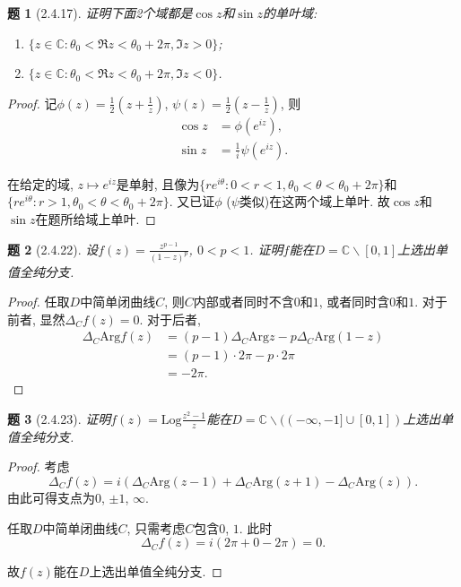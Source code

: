 \documentclass{article}[a4paper, 12pt]
\newtheorem{problem}{题}
\begin{document}
\begin{problem}[2.4.17]
  证明下面2个域都是\(\cos z\)和\(\sin z\)的单叶域:
  \begin{enumerate}
    \item \(\{z\in\mathbb C:\theta_0<\Re z<\theta_0+2\pi, \Im z>0\}\);
    \item \(\{z\in\mathbb C:\theta_0<\Re z<\theta_0+2\pi, \Im z<0\}\).
  \end{enumerate}
\end{problem}

\begin{proof}
  记\(\phi(z)=\frac12(z+\frac1z)\), \(\psi(z)=\frac12(z-\frac1z)\), 则\begin{align*}
    \cos z&=\phi(e^{iz}),\\
    \sin z&=\frac1i\psi(e^{iz}).
  \end{align*}

  在给定的域, \(z\mapsto e^{iz}\)是单射, 且像为\(\{re^{i\theta}:0<r<1,\theta_0<\theta<\theta_0+2\pi\}\)和\(\{re^{i\theta}:r>1,\theta_0<\theta<\theta_0+2\pi\}\). 又已证\(\phi\) (\(\psi\)类似)在这两个域上单叶. 故\(\cos z\)和\(\sin z\)在题所给域上单叶.
\end{proof}

\begin{problem}[2.4.22]
  设\(f(z)=\frac{z^{p-1}}{(1-z)^p}\), \(0<p<1\). 证明\(f\)能在\(D=\mathbb{C}\backslash[0,1]\)上选出单值全纯分支.
\end{problem}

\begin{proof}
  任取\(D\)中简单闭曲线\(C\), 则\(C\)内部或者同时不含\(0\)和\(1\), 或者同时含\(0\)和\(1\). 对于前者, 显然\(\Delta_C f(z)=0\). 对于后者, \begin{align*}
    \Delta_C \mathrm{Arg}f(z)
    &=(p-1)\Delta_C\mathrm{Arg}z-p\Delta_C\mathrm{Arg}(1-z)\\
    &=(p-1)\cdot2\pi-p\cdot2\pi\\
    &=-2\pi.
  \end{align*}
\end{proof}

\begin{problem}[2.4.23]
  证明\(f(z)=\mathrm{Log}\frac{z^2-1}{z}\)能在\(D=\mathbb{C}\backslash((-\infty,-1]\cup[0,1])\)上选出单值全纯分支.
\end{problem}

\begin{proof}
  考虑\[\Delta_C f(z)=i\left(\Delta_C\mathrm{Arg}(z-1)+\Delta_C\mathrm{Arg}(z+1)-\Delta_C\mathrm{Arg}(z)\right).\]
  由此可得支点为\(0\), \(\pm 1\), \(\infty\).

  任取\(D\)中简单闭曲线\(C\), 只需考虑\(C\)包含\(0\), \(1\). 此时
  \[\Delta_C f(z)=i(2\pi+0-2\pi)=0.\]

  故\(f(z)\)能在\(D\)上选出单值全纯分支.
\end{proof}
\end{document}
